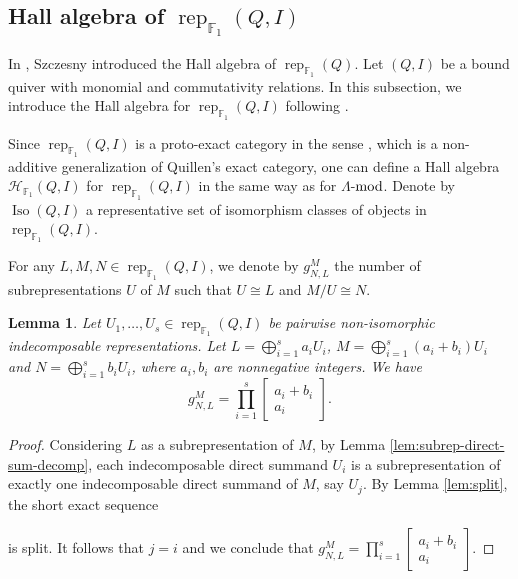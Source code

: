 \documentclass[12pt]{amsart}
\newtheorem{lemma}[theorem]{Lemma}
\theoremstyle{remark}
\theoremstyle{definition}
\numberwithin{equation}{section}
\newcommand{\sqbinom}[2]{\begin{bmatrix} #1 \\ #2 \end{bmatrix}}
\begin{document}
\subsection{Hall algebra of $\operatorname{rep}_{\mathbb{F}_1}(Q,I)$}
In \cite{Sz12}, Szczesny introduced the Hall algebra of $\operatorname{rep}_{\mathbb{F}_1}(Q)$. Let $(Q,I)$ be a bound quiver with monomial and commutativity relations. 
In this subsection, we introduce the Hall algebra for $\operatorname{rep}_{\mathbb{F}_1}(Q,I)$ following \cite{Sz12}.

Since $\operatorname{rep}_{\mathbb{F}_1}(Q,I)$ is a  proto-exact category
in the sense \cite{DK19}, which is a non-additive generalization of Quillen’s exact category, one can define a Hall algebra $\mathcal{H}_{\mathbb{F}_1}(Q,I)$ for $\operatorname{rep}_{\mathbb{F}_1}(Q,I)$ in the same way as for $\Lambda$-${\rm mod}$.
Denote by $\operatorname{Iso}(Q,I)$ a representative set of isomorphism classes of objects in $\operatorname{rep}_{\mathbb{F}_1}(Q,I)$.


For any ${L},{M},{N}\in \operatorname{rep}_{\mathbb{F}_1}(Q,I)$, we denote by
$g_{{N},{L}}^{M}$ the number of subrepresentations ${U}$ of ${M}$ such that ${U}\cong {L}$ and ${M}/{U}\cong {N}$. 
\begin{lemma}\label{lem:hall-number-split-case}
    Let ${U}_1,\ldots, {U}_s\in \operatorname{rep}_{\mathbb{F}_1}(Q,I)$ be pairwise non-isomorphic indecomposable representations. Let ${L}=\bigoplus_{i=1}^sa_i{U}_i$, ${M}=\bigoplus_{i=1}^s(a_i+b_i){U}_i$ and ${N}=\bigoplus_{i=1}^sb_i{U}_i$, where $a_i,b_i$ are nonnegative integers. We have
    \[
    g_{{N},{L}}^{M}=\prod_{i=1}^s\sqbinom{a_i+b_i}{a_i}.
    \]
\end{lemma}
\begin{proof}
Considering ${L}$ as a subrepresentation of ${M}$, by  Lemma \ref{lem:subrep-direct-sum-decomp}, each indecomposable direct summand ${U}_i$ is a subrepresentation of exactly one indecomposable direct summand of ${M}$, say ${U}_j$. 
By Lemma \ref{lem:split}, the short exact sequence  is split. It follows that $j=i$ and we conclude that $g_{{N},{L}}^{M}=\prod_{i=1}^s\sqbinom{a_i+b_i}{a_i}$.
\end{proof}
\end{document}
